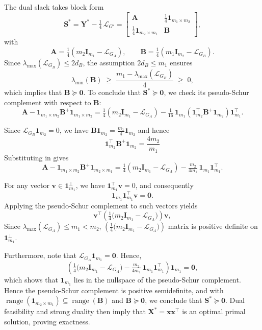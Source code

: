 \documentclass[a4paper,fleqn]{cas-sc}
\newcommand{\X}{\mathbf{X}}
\renewcommand{\L}{\mathcal{L}}
\newcommand{\I}{\mathbf{I}}
\newcommand{\1}{\mathbf{1}}
\newcommand{\A}{\mathbf{A}}
\newcommand{\x}{\mathbf{x}}
\newcommand{\bz}{\mathbf{0}}
\newcommand{\B}{\mathbf{B}}
\newcommand{\bS}{\mathbf{S}}
\newcommand{\Y}{\mathbf{Y}}
\newcommand{\bv}{\mathbf{v}}
\DeclareMathOperator{\range}{range}
\begin{document}
The dual slack takes block form
\[
\bS^* = \Y^* - \tfrac14\,\L_{G'} 
= \begin{bmatrix} \A & \frac{1}{4}\1_{m_1\times m_2} \\ \frac{1}{4}\1_{m_2\times m_1} & \B \end{bmatrix},
\]
with
\[
\A = \tfrac14(m_2 \I_{m_1} - \L_{G_A}), \qquad 
\B = \tfrac14(m_1 \I_{m_2} - \L_{G_B}).
\]
Since $\lambda_{\max}(\L_{G_B}) \le 2d_B$, the assumption $2d_B \le m_1$ ensures
\[
\lambda_{\min}(\B) 
\;\ge\; \dfrac{m_1 - \lambda_{\max}(\L_{G_B})}{4} \;\ge\; 0,
\]
which implies that $\B\succeq \bz$. To conclude that $\bS^*\succeq \bz$, we check its pseudo-Schur complement with respect to $\B$:
\begin{equation} \label{schur1}
\A - \1_{m_1 \times m_2} \B^{+} \1_{m_1 \times m_2}
= \tfrac14(m_2 \I_{m_1} - \L_{G_A}) 
- \tfrac{1}{16}\,\1_{m_1}\left(\1_{m_2}^\top \B^{+}\1_{m_2}\right)\1_{m_1}^\top.
\end{equation}

Since $\L_{G_B}\1_{m_2}=0$, we have $\B\1_{m_2}=\tfrac{m_1}{4}\1_{m_2}$ and hence 
\begin{equation}\label{schur2}
 \1_{m_2}^\top \B^{+}\1_{m_2}=\dfrac{4m_2}{m_1}   
\end{equation}
Substituting   in  gives
\[
\A - \1_{m_1 \times m_2} \B^{+} \1_{m_2 \times m_1}
= \tfrac14(m_2 \I_{m_1} - \L_{G_A}) 
- \tfrac{m_2}{4m_1}\,\1_{m_1}\1_{m_1}^\top.
\]

For any vector $\bv \in \1_{m_1}^\perp$, we have $\1_{m_1}^\top \bv = 0$, and consequently 
\[
\1_{m_1}\1_{m_1}^\top \bv = \bz.
\]
Applying the pseudo-Schur complement to such vectors yields
\[
\bv^\top \!\left(\tfrac{1}{4}\bigl(m_2 \I_{m_1} - \L_{G_A}\bigr)\right) \bv,
\]
Since $\lambda_{\max}(\L_{G_A}) \le m_1 < m_2$, $\!\left(\tfrac{1}{4}\bigl(m_2 \I_{m_1} - \L_{G_A}\bigr)\right)$ matrix is positive definite on $\1_{m_1}^\perp$.

Furthermore, note that $\L_{G_A}\1_{m_1} = \bz$. Hence,
\[
\left(\tfrac{1}{4}\bigl(m_2 \I_{m_1} - \L_{G_A}\bigr) 
- \tfrac{m_2}{4m_1}\,\1_{m_1}\1_{m_1}^\top\right)\1_{m_1} = \bz,
\]
which shows that $\1_{m_1}$ lies in the nullspace of the pseudo-Schur complement. Hence the pseudo-Schur complement is positive semidefinite, and with $\range(\1_{m_2\times m_1}) \subseteq \range(\B)$ and $\B\succeq \bz$, we conclude that $\bS^*\succeq \bz$. Dual feasibility and strong duality then imply that $\X^*=\x\x^\top$ is an optimal primal solution, proving exactness.
\end{document}
